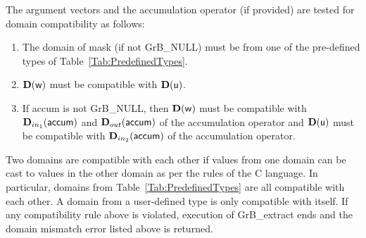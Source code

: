 The argument vectors and the accumulation 
operator (if provided) are tested for domain compatibility as follows:
\begin{enumerate}
	\item The domain of {\sf mask} (if not {\sf GrB\_NULL}) must be from one of 
    the pre-defined types of Table~\ref{Tab:PredefinedTypes}.

	\item $\bold{D}({\sf w})$ must be 
    compatible with $\bold{D}({\sf u})$.

	\item If {\sf accum} is not {\sf GrB\_NULL}, then $\bold{D}({\sf w})$ must be
    compatible with $\mbox{$\mathbf{D}_{in_{1}}$}({\sf accum})$ and $\mbox{$\mathbf{D}_{out}$}({\sf accum})$ of the accumulation operator and 
    $\bold{D}({\sf u})$ must be compatible with $\mbox{$\mathbf{D}_{in_{2}}$}({\sf accum})$ of the accumulation operator.
\end{enumerate}
Two domains are compatible with each other if values from one domain can be cast 
to values in the other domain as per the rules of the C language.
In particular, domains from Table~\ref{Tab:PredefinedTypes} are all compatible 
with each other. A domain from a user-defined type is only compatible with itself.
If any compatibility rule above is violated, execution of {\sf GrB\_extract} ends
and the domain mismatch error listed above is returned.

